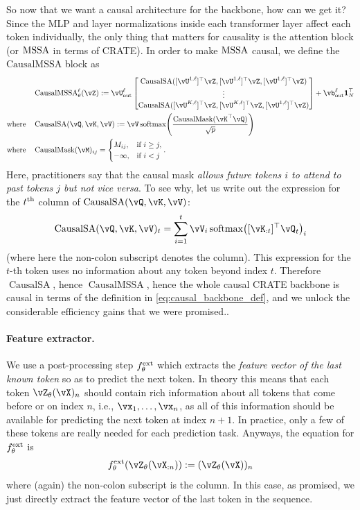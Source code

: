 \documentclass[../../book-main.tex]{subfiles}
\begin{document}
So now that we want a causal architecture for the backbone, how can we get it? Since the MLP and layer normalizations inside each transformer layer affect each token individually, the only thing that matters for causality is the attention block (or \(\operatorname{MSSA}\) in terms of CRATE). In order to make \(\operatorname{MSSA}\) causal, we define the \(\mathrm{CausalMSSA}\) block as 
\begin{align}
    &\operatorname{CausalMSSA}_{\theta}^{\ell}(\vZ) := \vU_{\out}^{\ell}\mat{\operatorname{CausalSA}([\vU^{1, \ell}]^{\top}\vZ, [\vU^{1, \ell}]^{\top}\vZ, [\vU^{1, \ell}]^{\top}\vZ) \\ \vdots \\ \operatorname{CausalSA}([\vU^{K, \ell}]^{\top}\vZ, [\vU^{K, \ell}]^{\top}\vZ, [\vU^{1, \ell}]^{\top}\vZ)} + \vb_{\out}^{\ell}\vone_{N}^{\top} \\ 
    \text{where} \quad & \operatorname{CausalSA}(\vQ, \vK, \vV) := \vV\softmax\rp{\frac{\operatorname{CausalMask}(\vK^{\top}\vQ)}{\sqrt{p}}} \\ 
    \text{where} \quad & \operatorname{CausalMask}(\vM)_{ij} = \casework{M_{ij}, & \text{if}\ i \geq j, \\ -\infty, & \text{if}\ i < j}.
\end{align}
Here, practitioners say that the causal mask \textit{allows future tokens \(i\) to attend to past tokens \(j\) but not vice versa}. To see why, let us write out the expression for the \(t^{\textnormal{th}}\) column of \(\operatorname{CausalSA}(\vQ, \vK, \vV)\):
\begin{equation}
    \operatorname{CausalSA}(\vQ, \vK, \vV)_{t} = \sum_{i = 1}^{t}\vV_{i}\softmax\rp{[\vK_{:t}]^{\top}\vQ_{t}}_{i}
\end{equation}
(where here the non-colon subscript denotes the column). This expression for the \(t\)-th token uses no information about any token beyond index \(t\). Therefore \(\operatorname{CausalSA}\), hence \(\operatorname{CausalMSSA}\), hence the whole causal CRATE backbone is causal in terms of the definition in \eqref{eq:causal_backbone_def}, and we unlock the considerable efficiency gains that we were promised.. 

\paragraph{Feature extractor.} We use a post-processing step \(f_{\theta}^{\mathrm{ext}}\) which extracts the \textit{feature vector of the last known token} so as to predict the next token. In theory this means that each token \(\vZ_{\theta}(\vX)_{n}\) should contain rich information about all tokens that come before or on index \(n\), i.e., \(\vx_{1}, \dots, \vx_{n}\), as all of this information should be available for predicting the next token at index \(n + 1\). In practice, only a few of these tokens are really needed for each prediction task. Anyways, the equation for \(f_{\theta}^{\mathrm{ext}}\) is 
\begin{equation}
    f_{\theta}^{\ext}(\vZ_{\theta}(\vX_{:n})) := (\vZ_{\theta}(\vX))_{n}
\end{equation}
where (again) the non-colon subscript is the column. In this case, as promised, we just directly extract the feature vector of the last token in the sequence.
\end{document}
